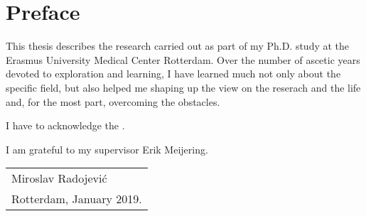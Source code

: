%
% 

\chpos{14mm}{10mm}
\chapter*{Preface}

This thesis describes the research carried out as part of my Ph.D. study at the Erasmus University Medical Center Rotterdam. Over the number of ascetic years devoted to exploration and learning, I have learned much not only about the specific field, but also helped me shaping up the view on the reserach and the life and, for the most part, overcoming the obstacles.

I have to acknowledge the . 

I am grateful to my supervisor Erik Meijering.

\bigskip
\begin{flushright}
  \begin{tabular}{@{}l@{}}
    Miroslav Radojevi\'{c}\\
    Rotterdam, January 2019.
  \end{tabular}
\end{flushright}
